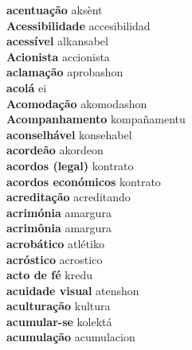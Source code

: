 \textbf{ acentuação  } aksènt \\
\textbf{ Acessibilidade  } accesibilidad \\
\textbf{ acessível  } alkansabel \\
\textbf{ Acionista  } accionista \\
\textbf{ aclamação  } aprobashon \\
\textbf{ acolá  } ei \\
\textbf{ Acomodação  } akomodashon \\
\textbf{ Acompanhamento  } kompañamentu \\
\textbf{ aconselhável  } konsehabel \\
\textbf{ acordeão  } akordeon \\
\textbf{ acordos (legal)  } kontrato \\
\textbf{ acordos económicos  } kontrato \\
\textbf{ acreditação  } acreditando \\
\textbf{ acrimónia  } amargura \\
\textbf{ acrimônia  } amargura \\
\textbf{ acrobático  } atlétiko \\
\textbf{ acróstico  } acrostico \\
\textbf{ acto de fé  } kredu \\
\textbf{ acuidade visual  } atenshon \\
\textbf{ aculturação  } kultura \\
\textbf{ acumular-se  } kolektá \\
\textbf{ acumulação  } acumulacion \\
